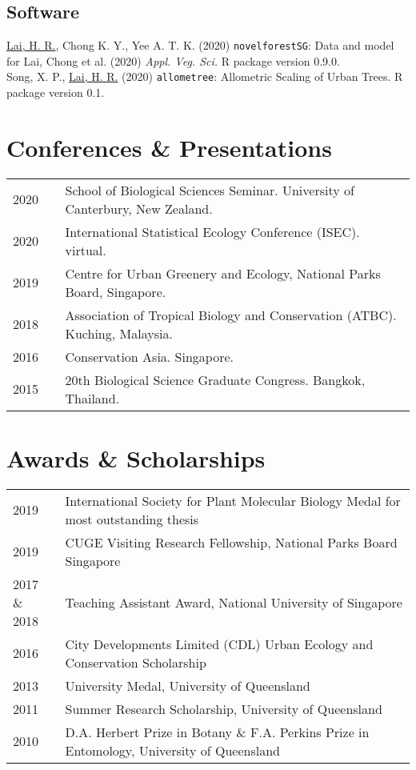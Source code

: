 \documentclass[a4paper]{article}
\begin{document}
\subsection*{Software}
\underline{Lai, H. R.}, Chong K. Y., Yee A. T. K. (2020) \texttt{novelforestSG}: Data and model for Lai, Chong et al. (2020) \textit{Appl. Veg. Sci.} R package version 0.9.0. \\

Song, X. P., \underline{Lai, H. R.} (2020) \texttt{allometree}: Allometric Scaling of Urban Trees. R package version 0.1.

\section*{Conferences \& Presentations}
\begin{tabular}{p{0.13\linewidth} p{0.87\linewidth}}
2020 & School of Biological Sciences Seminar. University of Canterbury, New Zealand. \\
2020 & International Statistical Ecology Conference (ISEC). virtual. \\
2019 & Centre for Urban Greenery and Ecology, National Parks Board, Singapore. \\
2018 & Association of Tropical Biology and Conservation (ATBC). Kuching, Malaysia. \\
2016 & Conservation Asia. Singapore. \\
2015 & 20th Biological Science Graduate Congress. Bangkok, Thailand. \\
\end{tabular}


\section*{Awards \& Scholarships}
\begin{tabular}{p{0.13\linewidth} p{0.87\linewidth}}
2019 & International Society for Plant Molecular Biology Medal for most outstanding thesis \\
2019 & CUGE Visiting Research Fellowship, National Parks Board Singapore \\
2017 \& 2018 & Teaching Assistant Award, National University of Singapore \\
2016 & City Developments Limited (CDL) Urban Ecology and Conservation Scholarship \\
2013 & University Medal, University of Queensland \\
2011 & Summer Research Scholarship, University of Queensland \\
2010 & D.A. Herbert Prize in Botany \& F.A. Perkins Prize in Entomology, University of Queensland 
\end{tabular}
\end{document}
